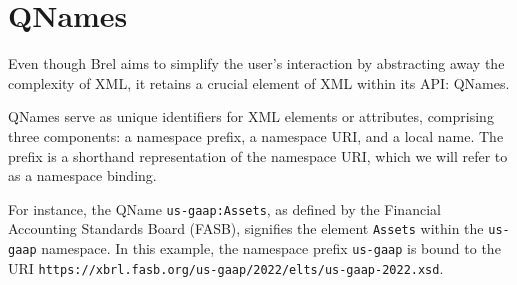 \section{QNames}
\label{sec:qnames}





Even though Brel aims to simplify the user's interaction by abstracting away the complexity of XML,
it retains a crucial element of XML within its API: QNames.

QNames serve as unique identifiers for XML elements or attributes,
comprising three components: a namespace prefix, a namespace URI, and a local name.
The prefix is a shorthand representation of the namespace URI, which we will refer to as a namespace binding.

For instance, the QName \texttt{us-gaap:Assets}, as defined by the Financial Accounting Standards Board (FASB)\cite{fasb},
signifies the element \texttt{Assets} within the \texttt{us-gaap} namespace.
In this example, the namespace prefix \texttt{us-gaap} is bound to the URI \texttt{https://xbrl.fasb.org/us-gaap/2022/elts/us-gaap-2022.xsd}\cite{fasb}.


